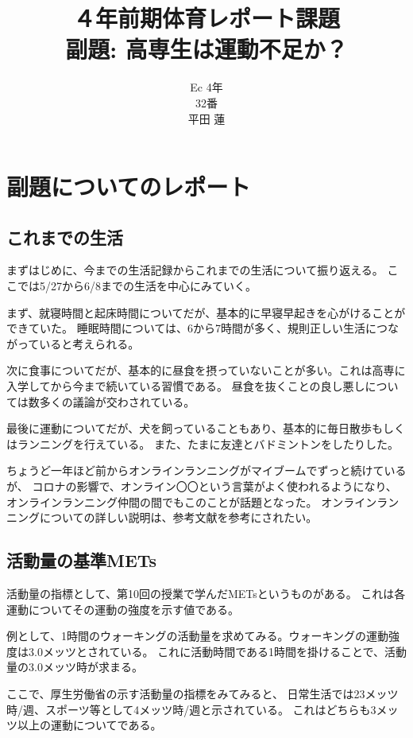 \documentclass[titlepage]{jsarticle}
\title{４年前期体育レポート課題\\副題: 高専生は運動不足か？}
\author{Ec 4年\\32番\\平田 蓮}
\date{}
\begin{document}
\maketitle

\section{副題についてのレポート}
    \subsection{これまでの生活}
        まずはじめに、今までの生活記録からこれまでの生活について振り返える。
        ここでは5/27から6/8までの生活を中心にみていく。

        まず、就寝時間と起床時間についてだが、基本的に早寝早起きを心がけることができていた。
        睡眠時間については、6から7時間が多く、規則正しい生活につながっていると考えられる。

        次に食事についてだが、基本的に昼食を摂っていないことが多い。これは高専に入学してから今まで続いている習慣である。
        昼食を抜くことの良し悪しについては数多くの議論が交わされている。

        最後に運動についてだが、犬を飼っていることもあり、基本的に毎日散歩もしくはランニングを行えている。
        また、たまに友達とバドミントンをしたりした。

        ちょうど一年ほど前からオンラインランニングがマイブームでずっと続けているが、
        コロナの影響で、オンライン〇〇という言葉がよく使われるようになり、オンラインランニング仲間の間でもこのことが話題となった。
        オンラインランニングについての詳しい説明は、参考文献\cite{online}を参考にされたい。

    \subsection{活動量の基準METs}
        活動量の指標として、第10回の授業で学んだMETsというものがある。
        これは各運動についてその運動の強度を示す値である。

        例として、1時間のウォーキングの活動量を求めてみる。ウォーキングの運動強度は3.0メッツとされている。
        これに活動時間である1時間を掛けることで、活動量の3.0メッツ時が求まる。

        ここで、厚生労働省の示す活動量の指標をみてみると、
        日常生活では23メッツ時/週、スポーツ等として4メッツ時/週と示されている。
        これはどちらも3メッツ以上の運動についてである。
\end{document}
